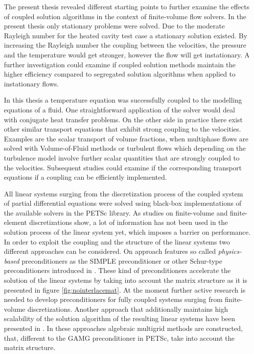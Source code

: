 The present thesis revealed different starting points to further examine the effects of coupled solution algorithms in the context of finite-volume flow solvers. In the present thesis only stationary problems were solved. Due to the moderate Rayleigh number for the heated cavity test case a stationary solution existed. By increasing the Rayleigh number the coupling between the velocities, the pressure and the temperature would get stronger, however the flow will get instationary. A further investigation could examine if coupled solution methods maintain the higher efficiency compared to segregated solution algorithms when applied to instationary flows.

In this thesis a temperature equation was successfully coupled to the modelling equations of a fluid. One straightforward application of the solver would deal with conjugate heat transfer problems. On the other side in practice there exist other similar transport equations that exhibit strong coupling to the velocities. Examples are the scalar transport of volume fractions, when multiphase flows are solved with Volume-of-Fluid methods or turbulent flows which depending on the turbulence model involve further scalar quantities that are strongly coupled to the velocities. Subsequent studies could examine if the corresponding transport equations if a coupling can be efficiently implemented.

All linear systems surging from the discretization process of the coupled system of partial differential equations were solved using black-box implementations of the available solvers in the PETSc library. As studies on finite-volume \cite{klaij13,darwish09,mairin14} and finite-element \cite{brown12,elman03,elman08,silvester01,turek02,mkcinnes14} discretizations show, a lot of information has not been used in the solution process of the linear system yet, which imposes a barrier on performance. In order to exploit the coupling and the structure of the linear systems two different approaches can be considered. On approach features so called \emph{physics-based} preconditioners as the SIMPLE preconditioner or other Schur-type preconditioners introduced in \cite{klaij13,elman08}. These kind of preconditioners accelerate the solution of the linear systems by taking into account the matrix structure as it is presented in figure \ref{fig:nointerlacemat}. At the moment further active research is needed to develop preconditioners for fully coupled systems surging from finite-volume discretizations. Another approach that additionally maintains high scalability of the solution algorithm of the resulting linear systems have been presented in \cite{darwish09,marin14}. In these approaches algebraic multigrid methods are constructed, that, different to the GAMG preconditioner in PETSc, take into account the matrix structure.

